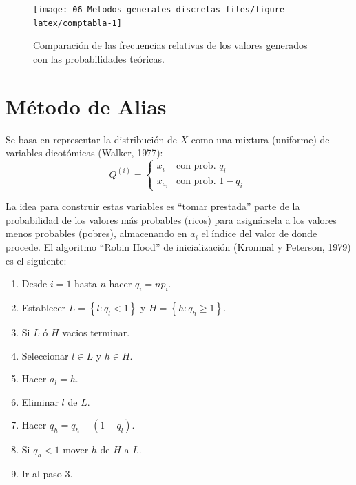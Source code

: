 \documentclass[]{book}
\theoremstyle{definition}
\theoremstyle{definition}
\theoremstyle{definition}
\theoremstyle{remark}
\begin{document}
\begin{figure}[!htb]

{\centering \texttt{[image: 06-Metodos\_generales\_discretas\_files/figure-latex/comptabla-1]} 

}

\caption{Comparación de las frecuencias relativas de los valores generados con las probabilidades teóricas.}\label{fig:comptabla}
\end{figure}

\section{Método de Alias}\label{alias}

Se basa en representar la distribución de \(X\) como una mixtura
(uniforme) de variables dicotómicas (Walker, 1977): \[Q^{(i)}=\left\{ 
\begin{array}{ll}
x_{i} & \text{con prob. } q_{i} \\ 
x_{a_{i}} & \text{con prob. } 1-q_{i}
\end{array}
\ \right.\]

La idea para construir estas variables es ``tomar prestada'' parte de la
probabilidad de los valores más probables (ricos) para asignársela a los
valores menos probables (pobres), almacenando en \(a_i\) el índice del
valor de donde procede. El algoritmo ``Robin Hood'' de inicialización
(Kronmal y Peterson, 1979) es el siguiente:

\begin{enumerate}
\def\labelenumi{\arabic{enumi}.}
\item
  Desde \(i=1\) hasta \(n\) hacer \(q_{i}=np_{i}\).
\item
  Establecer \(L=\left\{ l:q_{l}<1\right\}\) y
  \(H=\left\{ h:q_{h}\geq 1\right\}\).
\item
  Si \(L\) ó \(H\) vacios terminar.
\item
  Seleccionar \(l\in L\) y \(h\in H\).
\item
  Hacer \(a_{l}=h\).
\item
  Eliminar \(l\) de \(L\).
\item
  Hacer \(q_{h}=q_{h}-\left( 1-q_{l}\right)\).
\item
  Si \(q_{h}<1\) mover \(h\) de \(H\) a \(L\).
\item
  Ir al paso 3.
\end{enumerate}
\end{document}
